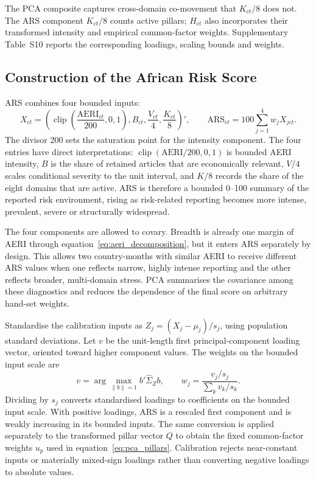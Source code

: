 \documentclass[12pt]{article}
\newcommand{\clip}{\operatorname{clip}}
\begin{document}
The PCA composite captures cross-domain co-movement that $K_{ct}/8$ does not. The ARS component $K_{ct}/8$ counts active pillars; $H_{ct}$ also incorporates their transformed intensity and empirical common-factor weights. Supplementary Table~S10 reports the corresponding loadings, scaling bounds and weights.

\subsection{Construction of the African Risk Score}\label{sec:ars}
ARS combines four bounded inputs:
\begin{equation}X_{ct}=\left(\clip\left(\frac{\mathrm{AERI}_{ct}}{200},0,1\right),B_{ct},\frac{V_{ct}}4,\frac{K_{ct}}8\right)',\qquad\mathrm{ARS}_{ct}=100\sum_{j=1}^{4}w_jX_{jct}.\label{eq:ars}\end{equation}
The divisor 200 sets the saturation point for the intensity component. The four entries have direct interpretations: $\clip(\mathrm{AERI}/200,0,1)$ is bounded AERI intensity, $B$ is the share of retained articles that are economically relevant, $V/4$ scales conditional severity to the unit interval, and $K/8$ records the share of the eight domains that are active. ARS is therefore a bounded 0--100 summary of the reported risk environment, rising as risk-related reporting becomes more intense, prevalent, severe or structurally widespread.

The four components are allowed to covary. Breadth is already one margin of AERI through equation~\eqref{eq:aeri_decomposition}, but it enters ARS separately by design. This allows two country-months with similar AERI to receive different ARS values when one reflects narrow, highly intense reporting and the other reflects broader, multi-domain stress. PCA summarises the covariance among these diagnostics and reduces the dependence of the final score on arbitrary hand-set weights.

Standardise the calibration inputs as $Z_j=(X_j-\mu_j)/s_j$, using population standard deviations. Let $v$ be the unit-length first principal-component loading vector, oriented toward higher component values. The weights on the bounded input scale are
\begin{equation}v=\arg\max_{\|b\|=1}b'\widehat\Sigma_Zb,\qquad w_j=\frac{v_j/s_j}{\sum_kv_k/s_k}.\label{eq:weights}\end{equation}
Dividing by $s_j$ converts standardised loadings to coefficients on the bounded input scale. With positive loadings, ARS is a rescaled first component and is weakly increasing in its bounded inputs. The same conversion is applied separately to the transformed pillar vector $Q$ to obtain the fixed common-factor weights $u_p$ used in equation~\eqref{eq:pca_pillars}. Calibration rejects near-constant inputs or materially mixed-sign loadings rather than converting negative loadings to absolute values.
\end{document}
